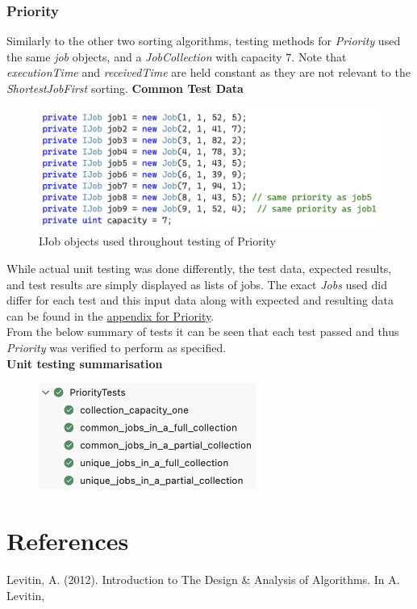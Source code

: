\documentclass[a4paper]{article}
\begin{document}
\subsubsection{Priority}
Similarly to the other two sorting algorithms, testing methods for \textit{Priority} used the same \textit{job} objects, and a \textit{JobCollection} with capacity $7$. Note that \textit{executionTime} and \textit{receivedTime} are held constant as they are not relevant to the \textit{ShortestJobFirst} sorting.
\textbf{Common Test Data}
\begin{figure}[H]
   \centering
   \includegraphics[height=4cm]{images/Priority-data.png}
   \caption{IJob objects used throughout testing of Priority}
\end{figure}
While actual unit testing was done differently, the test data, expected results, and test results are simply displayed as lists of jobs. The exact \textit{Jobs} used did differ for each test and this input data along with expected and resulting data can be found in the \hyperlink{subsubsection.5.3.1}{appendix for Priority}.
\\[3pt]
From the below summary of tests it can be seen that each test passed and thus \textit{Priority} was verified to perform as specified.
\\[6pt]
\textbf{Unit testing summarisation}
\begin{figure}[H]
   \includegraphics[height=3.5cm]{images/Priority-summary.png}
\end{figure}

\section{References}
Levitin, A. (2012). Introduction to The Design \& Analysis of Algorithms. In A. Levitin, 
\end{document}
